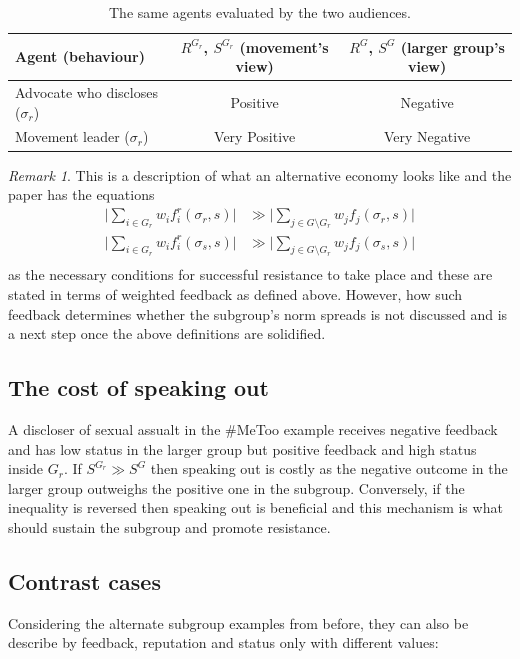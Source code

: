 \documentclass[11pt]{article}
\newcommand{\Gr}{G_{r}}          %
\newcommand{\sr}{\sigma_{r}}     %
\theoremstyle{definition}
\theoremstyle{remark}
\newtheorem{remark}{Remark}[section]
\begin{document}
\begin{table}[h]
\centering
\begin{tabular}{lcc}
\toprule
Agent (behaviour) & $R^{\Gr}$, $S^{\Gr}$ (movement's view) & $R^{G}$, $S^{G}$ (larger group's view) \\
\midrule
Advocate who discloses ($\sr$) & Positive & Negative \\
Movement leader ($\sr$)        & Very Positive & Very Negative \\
\bottomrule
\end{tabular}
\caption{The same agents evaluated by the two audiences.}
\end{table}
\begin{remark}
This is a description of what an alternative economy looks like and the paper has the equations
\begin{align*}
    \Big| \sum_{i \in G_r} w_if_i^r(\sigma_r, s) \Big| &\gg \Big| \sum_{j \in G \setminus G_r} w_jf_j(\sigma_r, s) \Big| \\
    \Big| \sum_{i \in G_r} w_if_i^r(\sigma_s, s) \Big| &\gg \Big| \sum_{j \in G \setminus G_r} w_jf_j(\sigma_s, s) \Big| \\
\end{align*}
as the necessary conditions for successful resistance to take place and these are stated in terms of weighted
feedback as defined above. However, how such feedback determines whether the subgroup's norm spreads is not discussed
and is a next step once the above definitions are solidified.

\end{remark}

\subsection{The cost of speaking out}
A discloser of sexual assualt in the \#MeToo example receives negative feedback and has low status in the larger
group but positive feedback and high status inside $G_r$. If $S^{G_r} \gg S^{G}$ then speaking
out is costly as the negative outcome in the larger group outweighs the positive one in the subgroup.
Conversely, if the inequality is reversed then speaking out is beneficial and this mechanism
is what should sustain the subgroup and promote resistance.

\subsection{Contrast cases}\label{sec:contrast}
Considering the alternate subgroup examples from before, they can also be describe by feedback, reputation and status
only with different values:
\end{document}
